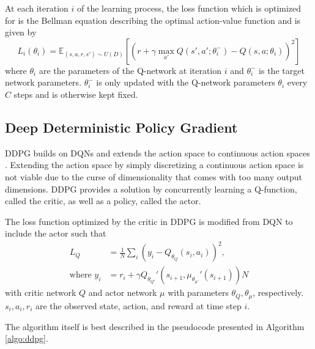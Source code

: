At each iteration $i$ of the learning process, the loss function which is optimized for is the Bellman equation describing the optimal action-value function and is given by
\begin{equation}
	L_i(\theta_i) = \mathbb{E}_{(s,a,r,s') \sim U(D)} \left[\left(
		r + \gamma \underset{a'}{\max}Q(s', a'; \theta_i^-) - Q(s,a; \theta_i)
	\right)^2\right]
\end{equation}
where $\theta_i$ are the parameters of the Q-network at iteration $i$ and $\theta_i^-$ is the target network parameters.
$\theta_i^-$ is only updated with the Q-network parameters $\theta_i$ every $C$ steps and is otherwise kept fixed.


\subsection{Deep Deterministic Policy Gradient}\label{subsec:background-ddpg}

DDPG builds on DQNs and extends the action space to continuous action spaces \cite{lillicrap2015continuous}.
Extending the action space by simply discretizing a continuous action space is not viable due to the curse of dimensionality that comes with too many output dimensions.
DDPG provides a solution by concurrently learning a Q-function, called the critic, as well as a policy, called the actor.

The loss function optimized by the critic in DDPG is modified from DQN to include the actor such that
\begin{align}
	L_Q &= \frac{1}{N}\sum_{i} \left(
		y_i - Q_{\theta_Q}(s_i, a_i)
	\right)^2, \label{eq:ddpg-lq}\\
	\text{where }y_i &= r_i + \gamma Q_{\theta_{Q'}}'(s_{i+1}, \mu_{\theta_{\mu'}}'(s_{i+1})) \label{eq:ddpg-y}
N\end{align}
with critic network $Q$ and actor network $\mu$ with parameters $\theta_Q, \theta_\mu$, respectively.
$s_i, a_i, r_i$ are the observed state, action, and reward at time step $i$.

The algorithm itself is best described in the pseudocode presented in Algorithm \ref{algo:ddpg}.

